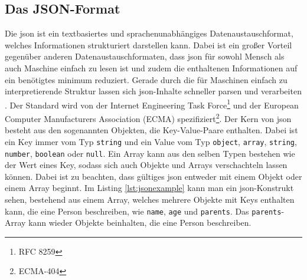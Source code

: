 \subsection{Das JSON-Format}
Die \ac{json} ist ein textbasiertes und sprachenunabhängiges Datenaustauschformat, welches Informationen strukturiert darstellen kann. Dabei ist ein großer Vorteil gegenüber anderen Datenaustauschformaten, dass \ac{json} für sowohl Mensch als auch Maschine einfach zu lesen ist und zudem die enthaltenen Informationen auf ein benötigtes minimum reduziert. Gerade durch die für Maschinen einfach zu interpretierende Struktur lassen sich \ac{json}-Inhalte schneller parsen und verarbeiten \parencite{WYS2014}. Der Standard wird von der Internet Engineering Task Force\footnote{RFC 8259} und der European Computer Manufacturers Association (ECMA) spezifiziert\footnote{ECMA-404}.\pbreak%
%
Der Kern von \ac{json} besteht aus den sogenannten Objekten, die Key-Value-Paare enthalten. Dabei ist ein Key immer vom Typ \texttt{string} und ein Value vom Typ \texttt{object}, \texttt{array}, \texttt{string}, \texttt{number}, \texttt{boolean} oder \texttt{null}. Ein Array kann aus den selben Typen bestehen wie der Wert eines Key, sodass sich auch Objekte und Arrays verschachteln lassen können. Dabei ist zu beachten, dass gültiges \ac{json} entweder mit einem Objekt oder einem Array beginnt. Im Listing \ref{lst:jsonexample} kann man ein \ac{json}-Konstrukt sehen, bestehend aus einem Array, welches mehrere Objekte mit Keys enthalten kann, die eine Person beschreiben, wie \texttt{name}, \texttt{age} und \texttt{parents}. %
Das \texttt{parents}-Array kann wieder Objekte beinhalten, die eine Person beschreiben.
%
%
